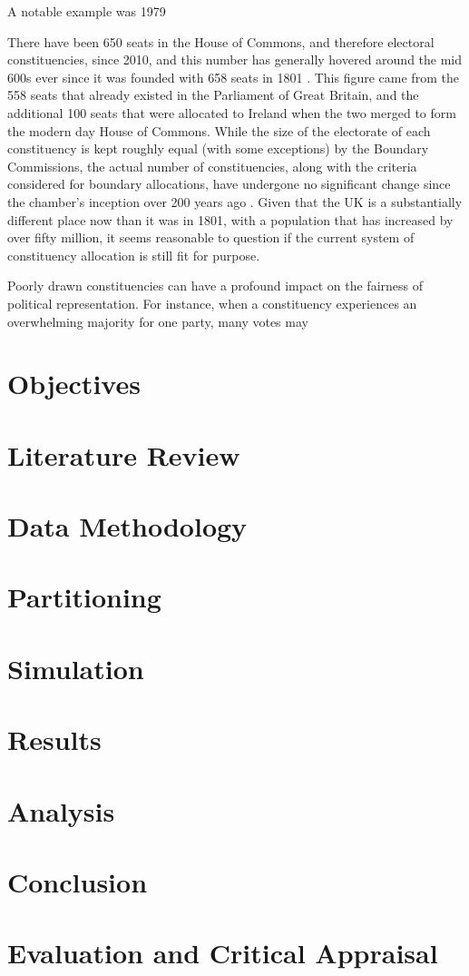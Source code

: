 \documentclass{article}
\begin{document}
A notable example was 1979

There have been 650 seats in the House of Commons, and therefore electoral constituencies, since 2010, and this number has generally hovered around the mid 600s ever
since it was founded with 658 seats in 1801 \cite{numofseats}. This figure came from the 558 seats that already existed in the Parliament 
of Great Britain, and the additional 100 seats that were allocated to Ireland when the two merged to form the modern day House of Commons. While the size of 
the electorate of each constituency is kept roughly equal  (with some exceptions) by the Boundary Commissions, the actual number of constituencies, along
with the criteria considered for boundary allocations, have undergone no significant change since the chamber's inception over 200 years ago \cite{parlcons}.
Given that the UK is a substantially different place now than it was in 1801, with a population that has increased by over fifty million, it seems reasonable to question
if the current system of constituency allocation is still fit for purpose.

Poorly drawn constituencies can have a profound impact on the fairness of political representation. For instance, when a constituency experiences an
overwhelming majority for one party, many votes may 

\section{Objectives}

\section{Literature Review}

\section{Data Methodology}

\section{Partitioning}

\section{Simulation}

\section{Results}

\section{Analysis}

\section{Conclusion}

\section{Evaluation and Critical Appraisal}



\end{document}
